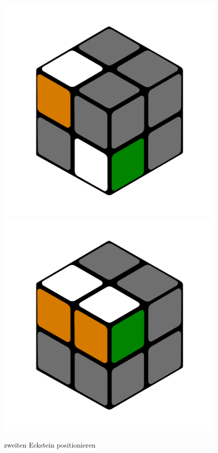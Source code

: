 \documentclass[12pt,a4paper, usenames, dvipsnames]{article}
\theoremstyle{mystyle}
\theoremstyle{definition}
\begin{document}
\begin{figure}[H]
\centering
\includegraphics[scale=0.1]{e1_s2_s1.png}
\includegraphics[scale=0.1]{e1_s2_s2.png}
\caption{zweiten Eckstein positionieren}
\label{Abbildung_ZweiterEckstein}
\end{figure}
\end{document}
